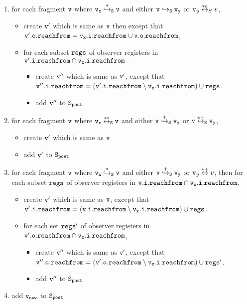 \begin{description}
\begin{enumerate}
\item for each fragment $\tt v$ where $\tt v_x \overset{*}\hookrightarrow_S v$ and either $\tt v \hookrightarrow_S \mathtt{v}_y$ or $\mathtt{v}_y \overset{*o}\leftrightarrow_S v$,  
\begin{itemize}
\item create $\tt v'$ which is same as $\tt v$ then except that $\tt \mathtt{v}'.\mathtt{o}.\mathtt{reachfrom} = v_x.i.reachfrom \cup \tt \mathtt{v}.\mathtt{o}.\mathtt{reachfrom}$, 
\item for each subset $\tt regs$ of observer registers in $\mathtt{v}'.\mathtt{i}.\mathtt{reachfrom} \cap \tt v_x.i.reachfrom$
\begin{itemize}
\item create $\tt v''$ which is same as $\tt v'$, except that $\tt v''.i.reachfrom = (\mathtt{v}'.\mathtt{i}.\mathtt{reachfrom} \setminus v_x.i.reachfrom) \cup regs$.
\item add $\tt v''$ to $\tt S_{post}$
\end{itemize}
\end{itemize}

\item for each fragment $\tt v$ where $\tt v_x \overset{**}\leftrightarrow_S v$ and either $\tt v \overset{+}\hookrightarrow_S \mathtt{v}_y$ or $\tt v \overset{*+}\leftrightarrow_S \mathtt{v}_y$, 
\begin{itemize}
\item create $\tt v'$ which is same as $\tt v$
\item  add $\tt v'$ to $\tt S_{post}$
\end{itemize}


\item for each fragment $\tt v$ where $\tt v_x \overset{*}\hookrightarrow_S v$ and either $\tt v \overset{+}\hookrightarrow_S \mathtt{v}_y$ or $\mathtt{v}_y \overset{*+}\leftrightarrow v$, then for each subset $\tt regs$ of observer registers in $\tt \mathtt{v}.\mathtt{i}.\mathtt{reachfrom} \cap \tt v_x.i.reachfrom$, 
\begin{itemize}
\item create $\tt v'$ which is same as $\tt v$, except that $\mathtt{v}'.\mathtt{i}.\mathtt{reachfrom} = (\tt \mathtt{v}.\mathtt{i}.\mathtt{reachfrom} \setminus v_x.i.reachfrom) \cup regs$. 
 \item for each set $\tt regs'$ of observer registers in $\mathtt{v}'.\mathtt{o}.\mathtt{reachfrom} \cap \tt v_x.i.reachfrom$,  
\begin{itemize}
\item create $\tt v''$ which is same as $\tt v'$, except that $\tt v''.o.reachfrom = (\mathtt{v}'.\mathtt{o}.\mathtt{reachfrom} \setminus v_x.i.reachfrom) \cup regs'$. 
\item add $\tt v''$ to $\tt S_{post}$
\end{itemize}
\end{itemize}
\item add $\tt v_{new}$ to $\tt S_{post}$
\end{enumerate}

\end{description}

